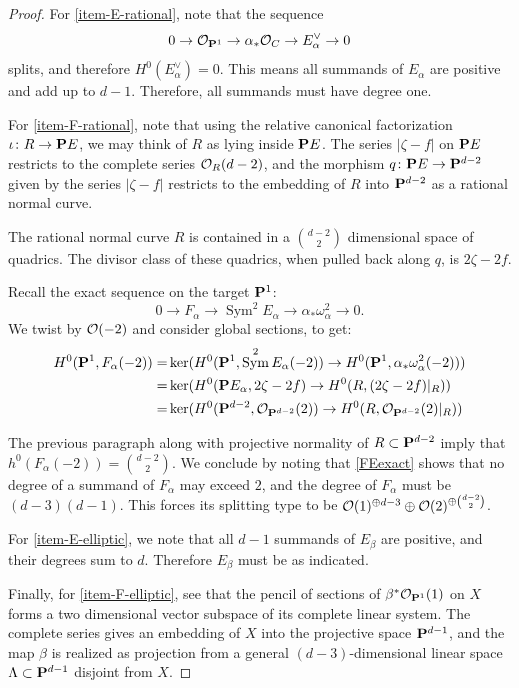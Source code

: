 \documentclass[11pt, two side, letterpaper, final]{amsart}
\renewcommand{\P}{{\bf P}}
\newcommand {\from}{\colon}
\DeclareMathOperator{\Sym}{Sym}
\begin{document}
\begin{proof} 
For \cref{item-E-rational}, note that the sequence
\[
0 \to \sh{O}_{\P^1} \to \alpha_*\sh{O}_C \to E_{\alpha}^\vee \to 0
\]
splits, and therefore $H^0(E_{\alpha}^\vee)=0$. This means all summands of $E_{\alpha}$ are positive and add up to $ d-1$.  Therefore, all summands must have degree one.

For \cref{item-F-rational}, note that using the relative canonical factorization $\iota \from R \to \P E$, we may think of $R$ as lying inside $\P E$. The series $|\zeta - f|$ on $\P E$ restricts to the complete series ${\mathcal O}_{R}(d-2)$, and the morphism $q \from \P E \to \P^{d-2}$ given by the series $|\zeta - f|$ restricts to the embedding of $R$ into $\P^{d-2}$ as a rational normal curve. 

The rational normal curve $R$ is contained in a $\binom{d-2}{2}$ dimensional space of quadrics.  The divisor class of these quadrics, when pulled back along $q$, is $2\zeta - 2f$.  

Recall the exact sequence on the target $\P^1$: 
\begin{equation}\label{FEexact}
0 \to F_{\alpha} \to \Sym^{2}E_{\alpha} \to \alpha_{*}{\omega^{2}_{\alpha}} \to 0.
\end{equation}
We twist by ${\mathcal O}(-2)$ and consider global sections, to get:
\begin{align*}
H^0(\P^1, F_{\alpha}(-2)) = & \ker (H^0(\P^1, \Sym^2E_{\alpha} (-2)) \to 
H^0(\P^1, \alpha_{*}{\omega^{2}_{\alpha}}(-2))) \\
= &\ker (H^0(\P E_\alpha, 2\zeta-2f) \to H^0(R, (2\zeta -2f)|_R)) \\
= & \ker (H^0(\P^{d-2}, \sh{O}_{\P^{d-2}}(2)) \to H^0(R,\sh{O}_{\P^{d-2}}(2)|_R ))  
\end{align*}

The previous paragraph along with projective normality of $R \subset \P^{d-2}$ imply that $h^{0}(F_{\alpha}(-2)) = \binom{d-2}{2}$.  We conclude by noting that \eqref{FEexact} shows that no degree of a summand of $F_{\alpha}$ may exceed $2$, and the degree of $F_{\alpha}$ must be $(d-3)(d-1)$.  This forces its splitting type to be ${\mathcal O}(1)^{\oplus d-3} \oplus {\mathcal O}(2)^{\oplus \binom{d-2}{2}}$.

For \cref{item-E-elliptic}, we note that all $d-1$ summands of $E_{\beta}$ are positive, and their degrees sum to $d$.  Therefore $E_{\beta}$ must be as indicated.

Finally, for \cref{item-F-elliptic}, see that the pencil of sections of $\beta^{*}\sh O_{\P^{1}}(1)$ on $X$ forms a two dimensional vector subspace of its complete linear system.  The complete series gives an embedding of $X$ into the projective space $\P^{d-1}$, and the map $\beta$ is realized as projection from a general $(d-3)$-dimensional linear space $\Lambda \subset \P^{d-1}$ disjoint from $X$. 


\end{proof}
\end{document}
